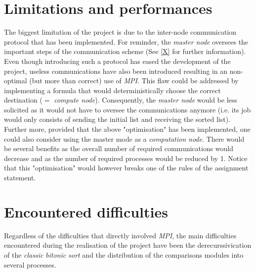\documentclass[a4paper,11pt]{article}
\begin{document}
\section{Limitations and performances}

  The biggest limitation of the project is due to the inter-node communication protocol that has been implemented. For reminder, the \textit{master node} oversees the important steps of the communication scheme (See \ref{X} for further information). %
  Even though introducing such a protocol has eased the development of the project, useless communications have also been introduced resulting in an non-optimal (but more than correct) use of \textit{MPI}.
  This flaw could be addressed by implementing a formula that would deterministically choose the correct destination ($=$ \textit{compute node}). Consequently, the \textit{master node} would be less solicited as it would not have to oversee the communications anymore (i.e. its job would only consists of sending the initial list and receiving the sorted list).\\
  
  \noindent Further more, provided that the above "optimisation" has been implemented, one could also consider using the master mode as a \textit{computation node}. There would be several benefits as the overall number of required communications would decrease and as the number of required processes would be reduced by 1. Notice that this "optimisation" would however breaks one of the rules of the assignment statement.

\section{Encountered difficulties}

  Regardless of the difficulties that directly involved \textit{MPI}, the main difficulties encountered during the realisation of the project have been the derecurssivication of the \textit{classic} \textit{bitonic sort} and the distribution of the comparisons modules into several processes. 
\end{document}
